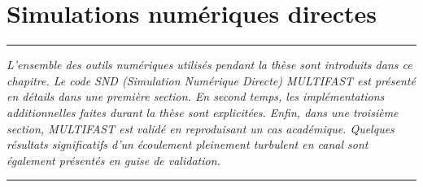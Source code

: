 
\lhead[\fancyplain{}{\leftmark}]%
      {\fancyplain{}{}} %
\chead[\fancyplain{}{}]%
      {\fancyplain{}{}}
\rhead[\fancyplain{}{}]%
      {\fancyplain{}{\rightmark}}%
\lfoot[\fancyplain{}{}]%
      {\fancyplain{}{}}
\cfoot[\fancyplain{}{\thepage}]%
      {\fancyplain{}{\thepage}} %
\rfoot[\fancyplain{}{}]%
     {\fancyplain{}{\scriptsize}}


\renewcommand\chapterheadstartvskip{\vspace*{-2\baselineskip}}
\chapter{Simulations numériques directes}
\label{ch/DNS}


\begin{center}
\rule{0.8\linewidth}{.5pt}
\begin{minipage}{0.8\linewidth}
\smallskip

\textit{L'ensemble des outils numériques utilisés pendant la thèse sont introduits dans ce chapitre. Le code SND (Simulation Numérique Directe) MULTIFAST est présenté en détails dans une première section. En second temps, les implémentations additionnelles faites durant la thèse sont explicitées. Enfin, dans une troisième section, MULTIFAST est validé en reproduisant un cas académique. Quelques résultats significatifs d'un écoulement pleinement turbulent en canal sont également présentés en guise de validation.}

\end{minipage}
\smallskip
\rule{0.8\linewidth}{.5pt}
\end{center}

\clearpage
\setbeforeminitoc
$~$
\vfill
\minitoc
\vfill
\newpage
\resetafterminitoc

